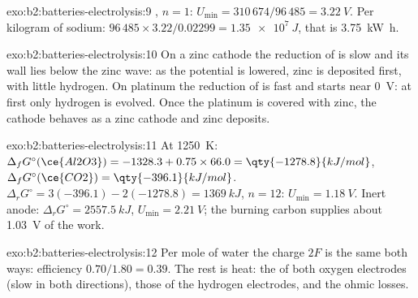 \begin{solution}{exo:b2:batteries-electrolysis:9}
, $n = 1$: $U_{\min} = 310\,674/96\,485 = \qty{3.22}{V}$.
Per kilogram of sodium: $96\,485 \times 3.22/0.02299 = \qty{1.35e7}{J}$, that is
\qty{3.75}{kW.h}.
\end{solution}

\begin{solution}{exo:b2:batteries-electrolysis:10}
On a zinc cathode the reduction of  is slow and its wall lies below the
zinc wave: as the potential is lowered, zinc is deposited first, with little
hydrogen. On platinum the reduction of  is fast and starts near
\qty{0}{V}: at first only hydrogen is evolved. Once the platinum is covered with
zinc, the cathode behaves as a zinc cathode and zinc deposits.
\end{solution}

\begin{solution}{exo:b2:batteries-electrolysis:11}
At \qty{1250}{K}: $\Delta_f G^\circ(\ce{Al2O3}) = -1328.3 + 0.75 \times 66.0 =
\qty{-1278.8}{kJ/mol}$, $\Delta_f G^\circ(\ce{CO2}) = \qty{-396.1}{kJ/mol}$. $\Delta_r G^\circ =
3(-396.1) - 2(-1278.8) = \qty{1369}{kJ}$, $n = 12$: $U_{\min} = \qty{1.18}{V}$. Inert anode:
$\Delta_r G^\circ = \qty{2557.5}{kJ}$, $U_{\min} = \qty{2.21}{V}$; the burning carbon
supplies about \qty{1.03}{V} of the work.
\end{solution}

\begin{solution}{exo:b2:batteries-electrolysis:12}
Per mole of water the charge $2F$ is the same both ways: efficiency $0.70/1.80 =
0.39$. The rest is heat: the  of both oxygen electrodes (slow in
both directions), those of the hydrogen electrodes, and the ohmic losses.
\end{solution}

